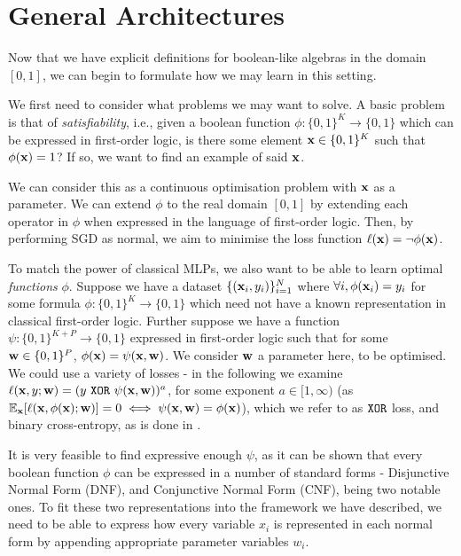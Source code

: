 \section{General Architectures}
\label{section:fuzzyloss}

Now that we have explicit definitions for boolean-like algebras in the domain $[0,1]$, we can begin to formulate how we may learn in this setting.

We first need to consider what problems we may want to solve. A basic problem is that of \textit{satisfiability}, i.e., given a boolean function $\phi : \{0,1\}^K \rightarrow \{0,1\}$ which can be expressed in first-order logic, is there some element $\mathbf{x} \in \{0,1\}^K$ such that $\phi(\mathbf{x}) = 1$? If so, we want to find an example of said $\mathbf{x}$.

We can consider this as a continuous optimisation problem with $\mathbf{x}$ as a parameter. We can extend $\phi$ to the real domain $[0,1]$ by extending each operator in $\phi$ when expressed in the language of first-order logic. Then, by performing SGD as normal, we aim to minimise the loss function $\ell(\mathbf{x}) = \lnot\phi(\mathbf{x})$.

To match the power of classical MLPs, we also want to be able to learn optimal \textit{functions} $\phi$. Suppose we have a dataset $\{(\mathbf{x}_i, y_i)\}_{i=1}^N$ where $\forall i, \phi(\mathbf{x}_i) = y_i$ for some formula $\phi : \{0,1\}^K  \rightarrow \{0,1\}$ which need not have a known representation in classical first-order logic. Further suppose we have a function $\psi : \{0,1\}^{K+P} \rightarrow \{0,1\}$ expressed in first-order logic such that for some $\mathbf{w} \in \{0,1\}^P$, $\phi(\mathbf{x}) = \psi(\mathbf{x}, \mathbf{w})$. We consider $\mathbf{w}$ a parameter here, to be optimised. We could use a variety of losses - in the following we examine $\ell(\mathbf{x}, y; \mathbf{w}) = (y \ \texttt{XOR}\  \psi(\mathbf{x}, \mathbf{w}))^a$, for some exponent $a \in [1,\infty)$ (as $\mathbb{E}_{\mathbf{x}}[\ell(\mathbf{x}, \phi(\mathbf{x}); \mathbf{w})] = 0 \iff \psi(\mathbf{x}, \mathbf{w}) = \phi(\mathbf{x})$), which we refer to as $\texttt{XOR}$ loss, and binary cross-entropy, as is done in \cite{embeddedlogicreg}. 

It is very feasible to find expressive enough $\psi$, as it can be shown that every boolean function $\phi$ can be expressed in a number of standard forms - Disjunctive Normal Form (DNF), and Conjunctive Normal Form (CNF), being two notable ones. To fit these two representations into the framework we have described, we need to be able to express how every variable $x_i$ is represented in each normal form by appending appropriate parameter variables $w_i$.

